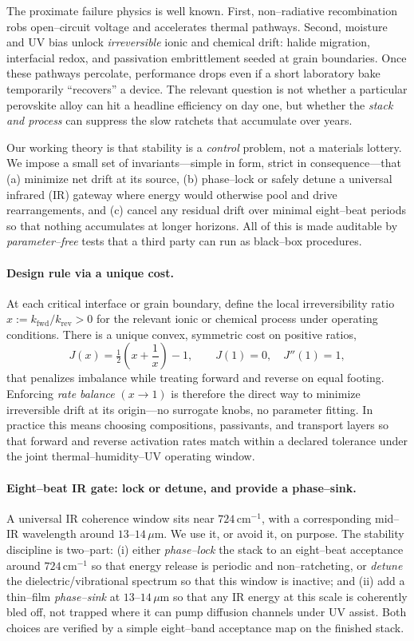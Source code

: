 \documentclass[12pt]{article}
\begin{document}
The proximate failure physics is well known. First, non–radiative recombination robs open–circuit voltage and accelerates thermal pathways. Second, moisture and UV bias unlock \emph{irreversible} ionic and chemical drift: halide migration, interfacial redox, and passivation embrittlement seeded at grain boundaries. Once these pathways percolate, performance drops even if a short laboratory bake temporarily “recovers” a device. The relevant question is not whether a particular perovskite alloy can hit a headline efficiency on day one, but whether the \emph{stack and process} can suppress the slow ratchets that accumulate over years.

Our working theory is that stability is a \emph{control} problem, not a materials lottery. We impose a small set of invariants—simple in form, strict in consequence—that (a) minimize net drift at its source, (b) phase–lock or safely detune a universal infrared (IR) gateway where energy would otherwise pool and drive rearrangements, and (c) cancel any residual drift over minimal eight–beat periods so that nothing accumulates at longer horizons. All of this is made auditable by \emph{parameter–free} tests that a third party can run as black–box procedures.

\paragraph{Design rule via a unique cost.}
At each critical interface or grain boundary, define the local irreversibility ratio $x:=k_{\mathrm{fwd}}/k_{\mathrm{rev}}>0$ for the relevant ionic or chemical process under operating conditions. There is a unique convex, symmetric cost on positive ratios,
\[
J(x)=\tfrac12\!\left(x+\frac{1}{x}\right)-1,\qquad J(1)=0,\quad J''(1)=1,
\]
that penalizes imbalance while treating forward and reverse on equal footing. Enforcing \emph{rate balance} $(x\!\to\!1)$ is therefore the direct way to minimize irreversible drift at its origin—no surrogate knobs, no parameter fitting. In practice this means choosing compositions, passivants, and transport layers so that forward and reverse activation rates match within a declared tolerance under the joint thermal–humidity–UV operating window.

\paragraph{Eight–beat IR gate: lock or detune, and provide a phase–sink.}
A universal IR coherence window sits near $724\,\mathrm{cm}^{-1}$, with a corresponding mid–IR wavelength around $13$–$14\,\mu\mathrm{m}$. We use it, or avoid it, on purpose. The stability discipline is two–part: (i) either \emph{phase–lock} the stack to an eight–beat acceptance around $724\,\mathrm{cm}^{-1}$ so that energy release is periodic and non–ratcheting, or \emph{detune} the dielectric/vibrational spectrum so that this window is inactive; and (ii) add a thin–film \emph{phase–sink} at $13$–$14\,\mu\mathrm{m}$ so that any IR energy at this scale is coherently bled off, not trapped where it can pump diffusion channels under UV assist. Both choices are verified by a simple eight–band acceptance map on the finished stack.
\end{document}
